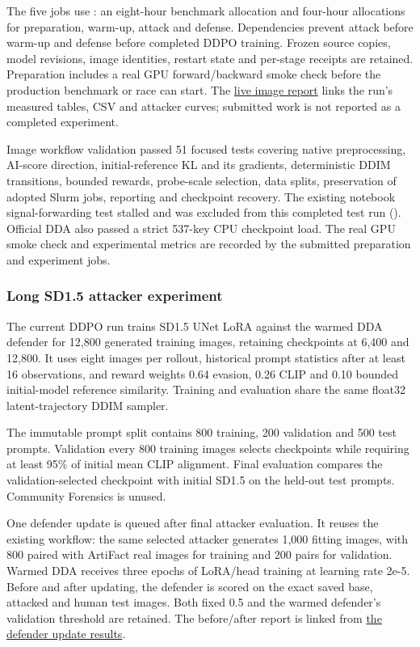 The five jobs use \texttt{}: an eight-hour
benchmark allocation and four-hour allocations for preparation, warm-up,
attack and defense. Dependencies prevent attack before warm-up and
defense before completed DDPO training. Frozen source copies, model
revisions, image identities, restart state and per-stage receipts are
retained. Preparation includes a real GPU forward/backward smoke check
before the production benchmark or race can start. The
\href{records/docs/image_reference_reward_results.tex}{live image
report} links the run's measured tables, CSV and attacker curves;
submitted work is not reported as a completed experiment.

Image workflow validation passed 51 focused tests covering native
preprocessing, AI-score direction, initial-reference KL and its
gradients, deterministic DDIM transitions, bounded rewards, probe-scale
selection, data splits, preservation of adopted Slurm jobs, reporting
and checkpoint recovery. The existing notebook signal-forwarding test
stalled and was excluded from this completed test run
(\texttt{}). Official DDA also passed a
strict 537-key CPU checkpoint load. The real GPU smoke check and
experimental metrics are recorded by the submitted preparation and
experiment jobs.

\subsubsection{Long SD1.5 attacker
experiment}\label{record-docs-research-guide-md-long-sd1.5-attacker-experiment}

The current DDPO run trains SD1.5 UNet LoRA against the warmed DDA
defender for 12,800 generated training images, retaining checkpoints at
6,400 and 12,800. It uses eight images per rollout, historical prompt
statistics after at least 16 observations, and reward weights 0.64
evasion, 0.26 CLIP and 0.10 bounded initial-model reference similarity.
Training and evaluation share the same float32 latent-trajectory DDIM
sampler.

The immutable prompt split contains 800 training, 200 validation and 500
test prompts. Validation every 800 training images selects checkpoints
while requiring at least 95\% of initial mean CLIP alignment. Final
evaluation compares the validation-selected checkpoint with initial
SD1.5 on the held-out test prompts. Community Forensics is unused.

One defender update is queued after final attacker evaluation. It reuses
the existing \texttt{} workflow: the same
selected attacker generates 1,000 fitting images, with 800 paired with
ArtiFact real images for training and 200 pairs for validation. Warmed
DDA receives three epochs of LoRA/head training at learning rate 2e-5.
Before and after updating, the defender is scored on the exact saved
base, attacked and human test images. Both fixed 0.5 and the warmed
defender's validation threshold are retained. The before/after report is
linked from \href{records/docs/image_defender_update_results.tex}{the
defender update results}.

